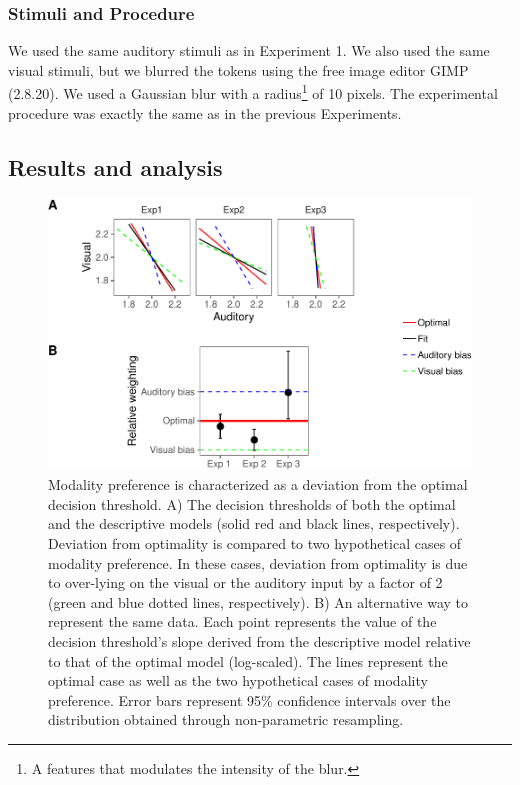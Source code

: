 \documentclass[english,,man,floatsintext]{apa6}
\let\rmarkdownfootnote\footnote%
\def\footnote{\protect\rmarkdownfootnote}
\theoremstyle{definition}
\theoremstyle{definition}
\theoremstyle{definition}
\theoremstyle{remark}
\begin{document}
\subsubsection{Stimuli and Procedure}\label{stimuli-and-procedure-1}

We used the same auditory stimuli as in Experiment 1. We also used the
same visual stimuli, but we blurred the tokens using the free image
editor GIMP (2.8.20). We used a Gaussian blur with a
radius\footnote{A features that modulates the intensity of the blur.} of
10 pixels. The experimental procedure was exactly the same as in the
previous Experiments.

\subsection{Results and analysis}\label{results-and-analysis-3}

\begin{figure}[!h]
\includegraphics[width=\textwidth]{ms_files/figure-latex/bias-1} \caption{Modality preference is characterized as a deviation from the optimal decision threshold. A) The decision thresholds of both the optimal and the descriptive models (solid red and black lines, respectively). Deviation from optimality is compared to two hypothetical cases of modality preference. In these cases, deviation from  optimality is due to over-lying on the visual or the auditory input by a factor of 2 (green and blue dotted lines, respectively). B) An alternative way to represent the same data. Each point represents the value of the decision threshold's slope derived from the descriptive model relative to that of the optimal model (log-scaled). The lines represent the optimal case as well as the two hypothetical cases of modality preference. Error bars represent 95\% confidence intervals over the distribution obtained through non-parametric resampling.}\label{fig:bias}
\end{figure}
\end{document}
